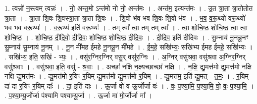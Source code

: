 \documentclass[17pt]{extarticle}
\begin{document}
1. त्वन्नो॑ न॒स्त्वम् त्वन्नः॑ । . नो॒ अन्त॒मो ऽन्त॑मो नो नो॒ अन्त॑मः । . अन्त॑म॒ इत्यन्त॑मः । . उ॒त त्रा॒ता त्रा॒तोतोत त्रा॒ता । . त्रा॒ता शि॒वः शि॒वस्त्रा॒ता त्रा॒ता शि॒वः । . शि॒वो भ॑व भव शि॒वः शि॒वो भ॑व । . भ॒व॒ व॒रू॒थ्यो॑ वरू॒थ्यो॑ भव भव वरू॒थ्यः॑ । . व॒रू॒थ्य॑ इति॑ वरू॒थ्यः॑ । . तम् त्वा᳚ त्वा॒ तम् तम् त्वा᳚ । . त्वा॒ शो॒चि॒ष्ठ॒ शो॒चि॒ष्ठ॒ त्वा॒ त्वा॒ शो॒चि॒ष्ठ॒ । . शो॒चि॒ष्ठ॒ दी॒दि॒वो॒ दी॒दि॒वः॒ शो॒चि॒ष्ठ॒ शो॒चि॒ष्ठ॒ दी॒दि॒वः॒ । . दी॒दि॒व॒ इति॑ दीदिवः । . सु॒म्नाय॑ नू॒नन्नू॒नꣳ सु॒म्नाय॑ सु॒म्नाय॑ नू॒नम् । . नू॒न मी॑मह ईमहे नू॒नन्नू॒न मी॑महे । . ई॒म॒हे॒ सखि॑भ्यः॒ सखि॑भ्य ईमह ईमहे॒ सखि॑भ्यः । . सखि॑भ्य॒ इति॒ सखि॑ - भ्यः॒ । . वसु॑र॒ग्निर॒ग्निर् वसु॒र् वसु॑र॒ग्निः । . अ॒ग्निर् वसु॑श्रवा॒ वसु॑श्रवा अ॒ग्निर॒ग्निर् वसु॑श्रवाः । . वसु॑श्रवा॒ इति॒ वसु॑ - श्र॒वाः॒ । . अच्छा॑ नक्षि न॒क्ष्यच्छाच्छा॑ नक्षि । . न॒क्षि॒ द्यु॒मत्त॑मो द्यु॒मत्त॑मो नक्षि नक्षि द्यु॒मत्त॑मः । . द्यु॒मत्त॑मो र॒यिꣳ र॒यिम् द्यु॒मत्त॑मो द्यु॒मत्त॑मो र॒यिम् । . द्यु॒मत्त॑म॒ इति॑ द्यु॒मत् - त॒मः॒ । . र॒यिम् दा॑ दा र॒यिꣳ र॒यिम् दाः᳚ । . दा॒ इति॑ दाः । . ऊ॒र्जा वो॑ व ऊ॒र्जोर्जा वः॑ । . वः॒ प॒श्या॒मि॒ प॒श्या॒मि॒ वो॒ वः॒ प॒श्या॒मि॒ । . प॒श्या॒म्यू॒र्जोर्जा प॑श्यामि पश्याम्यू॒र्जा । . ऊ॒र्जा मा॑ मो॒र्जोर्जा मा᳚ । \newline
\end{document}
